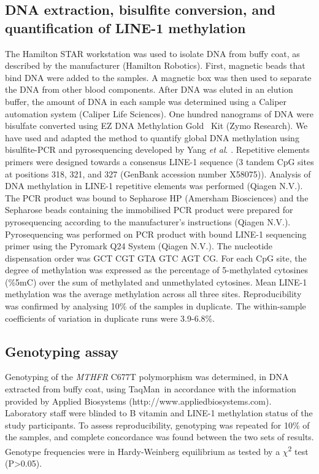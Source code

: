 \subsection{DNA extraction, bisulfite conversion, and quantification of LINE-1 methylation} %
\noindent The Hamilton STAR workstation was used to isolate DNA from buffy coat, as described by the manufacturer (Hamilton Robotics). First, magnetic beads that bind DNA were added to the samples. A magnetic box was then used to separate the DNA from other blood components. After DNA was eluted in an elution buffer, the amount of DNA in each sample was determined using a Caliper automation system (Caliper Life Sciences). One hundred nanograms of DNA were bisulfate converted using EZ DNA Methylation Gold\texttrademark~ Kit (Zymo Research). We have used and adapted the method to quantify global DNA methylation using bisulfite-PCR and pyrosequencing developed by Yang \emph{et al}. \cite{c328}. Repetitive elements primers were designed towards a consensus LINE-1 sequence (3 tandem CpG sites at positions 318, 321, and 327 (GenBank accession number X58075)). Analysis of DNA methylation in LINE-1 repetitive elements was performed (Qiagen N.V.). The PCR product was bound to Sepharose HP (Amersham Biosciences) and the Sepharose beads containing the immobilised PCR product were prepared for pyrosequencing according to the manufacturer's instructions (Qiagen N.V.). Pyrosequencing was performed on PCR product with bound LINE-1 sequencing primer using the Pyromark Q24 System (Qiagen N.V.). The nucleotide dispensation order was GCT CGT GTA GTC AGT CG. For each CpG site, the degree of methylation was expressed as the percentage of 5-methylated cytosines (\%5mC) over the sum of methylated and unmethylated cytosines. Mean LINE-1 methylation was the average methylation across all three sites. Reproducibility was confirmed by analysing 10\% of the samples in duplicate. The within-sample coefficients of variation in duplicate runs were 3.9-6.8\%.

\subsection{Genotyping assay} %
\noindent Genotyping of the \emph{MTHFR} C677T polymorphism was determined, in DNA extracted from buffy coat, using TaqMan\textregistered~in accordance with the information provided by Applied Biosystems (http://www.appliedbiosystems.com). Laboratory staff were blinded to B vitamin and LINE-1 methylation status of the study participants. To assess reproducibility, genotyping was repeated for 10\% of the samples, and complete concordance was found between the two sets of results. Genotype frequencies were in Hardy-Weinberg equilibrium as tested by a $\chi$\textsuperscript{2} test (P>0.05).

